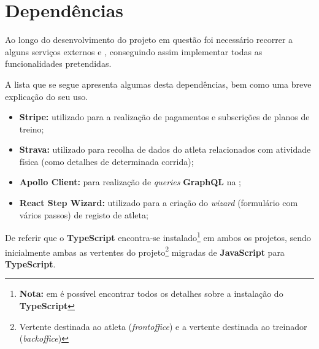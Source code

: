 \section{Dependências}

Ao longo do desenvolvimento do projeto em questão foi necessário recorrer a alguns serviços externos e , conseguindo assim implementar todas as funcionalidades pretendidas.

A lista que se segue apresenta algumas desta dependências, bem como uma breve explicação do seu uso.

\begin{itemize}
	\item \textbf{Stripe:} utilizado para a realização de pagamentos e subscrições de planos de treino;
	\item \textbf{Strava:} utilizado para recolha de dados do atleta relacionados com atividade física (como detalhes de determinada corrida);
	\item \textbf{Apollo Client:} para realização de \textit{queries} \textbf{GraphQL} na ;
	\item \textbf{React Step Wizard:} utilizado para a criação do \textit{wizard} (formulário com vários passos) de registo de atleta;
\end{itemize}

De referir que o \textbf{TypeScript} encontra-se instalado\footnote{\textbf{Nota:} em  é possível encontrar todos os detalhes sobre a instalação do \textbf{TypeScript}} em ambos os projetos, sendo inicialmente ambas as vertentes do projeto\footnote{Vertente destinada ao atleta (\textit{frontoffice}) e a vertente destinada ao treinador (\textit{backoffice})} migradas de \textbf{JavaScript} para \textbf{TypeScript}.